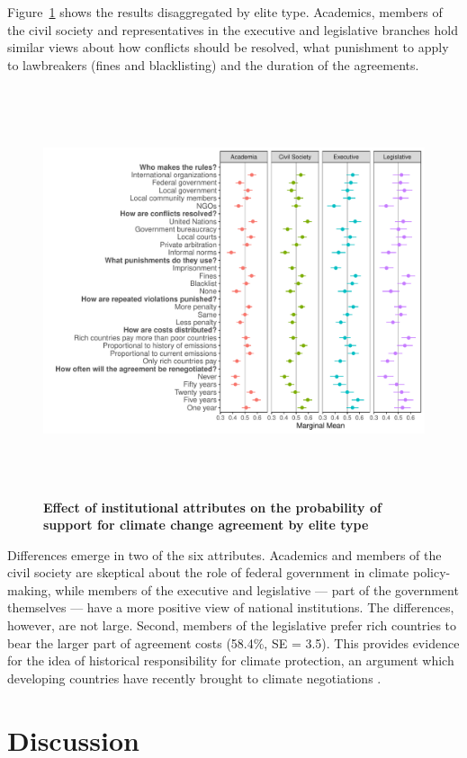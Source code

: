 \documentclass[a4paper,12pt]{article}
\begin{document}
Figure~\ref{fig:types} shows the results disaggregated by elite type. Academics, members of the civil society and representatives in the executive and legislative branches hold similar views about how conflicts should be resolved, what punishment to apply to lawbreakers (fines and blacklisting) and the duration of the agreements.

\begin{figure}[H]
	\centering
	\includegraphics[height=12cm]{MM_membertype.pdf}
	\caption{\textbf{Effect of institutional attributes on the probability of support for climate change agreement by elite type}}
	\label{fig:types}
\end{figure}

Differences emerge in two of the six attributes. Academics and members of the civil society are skeptical about the role of federal government in climate policy-making, while members of the executive and legislative --- part of the government themselves --- have a more positive view of national institutions. The differences, however, are not large. Second, members of the legislative prefer rich countries to bear the larger part of agreement costs (58.4\%, SE = 3.5). This provides evidence for the idea of historical responsibility for climate protection, an argument which developing countries have recently brought to climate negotiations \citep{muller2009differentiating,friman2015agreement}.

\section{Discussion}%
\label{sec:discussion}
\end{document}
